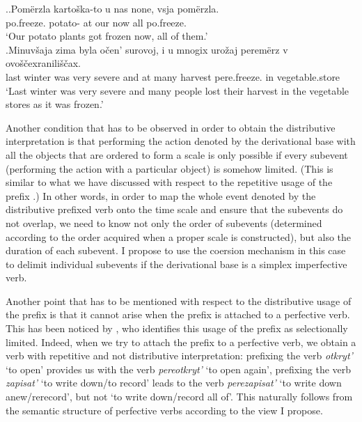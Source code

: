 \ex.\ag.\label{ex:po:merz}Pom\"{e}rzla karto\v{s}ka-to u nas none, vsja pom\"{e}rzla.\\
po.freeze. potato- at our now all po.freeze.\\
\trans `Our potato plants got frozen now, all of them.'\\
\bg.\label{ex:pere:merz}Minuv\v{s}aja zima byla o\v{c}en' surovoj, i u mnogix uro\v{z}aj perem\"{e}rz v ovo\v{s}\v{c}exranili\v{s}\v{c}ax.\\
last winter was very severe and at many harvest pere.freeze. in vegetable.store\\
\trans `Last winter was very severe and many people lost their harvest in the vegetable stores as it was frozen.'

Another condition that has to be observed in order to obtain the distributive interpretation is that performing the action denoted by the derivational base with all the objects that are ordered to form a scale is only possible if every subevent (performing the action with a particular object) is somehow limited. (This is similar to what we have discussed with respect to the repetitive usage of the prefix .) In other words, in order to map the whole event denoted by the distributive prefixed verb onto the time scale and ensure that the subevents do not overlap, we need to know not only the order of subevents (determined according to the order acquired when a proper scale is constructed), but also the duration of each subevent. I propose to use the coersion mechanism in this case to delimit individual subevents if the derivational base is a simplex imperfective verb.

Another point that has to be mentioned with respect to the distributive usage of the prefix  is that it cannot arise when the prefix is attached to a perfective verb. This has been noticed by \citet{Tatevosov:09}, who identifies this usage of the prefix as selectionally limited. Indeed, when we try to attach the prefix  to a perfective verb, we obtain a verb with repetitive and not distributive interpretation: prefixing the verb \textit{otkryt'} `to open' provides us with the verb \textit{pereotkryt'} `to open again', prefixing the verb \textit{zapisat'} `to write down/to record' leads to the verb \textit{perezapisat'} `to write down anew/rerecord', but not `to write down/record all of'. This naturally follows from the semantic structure of perfective verbs according to the view I propose.

